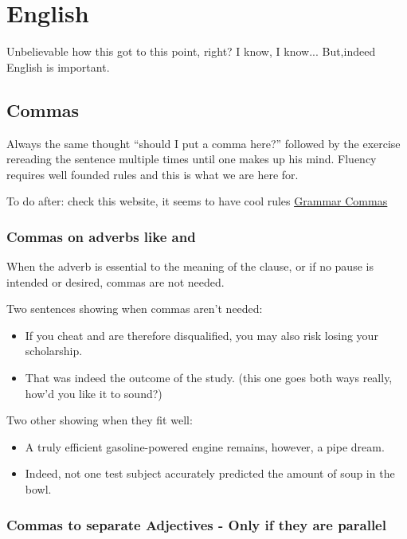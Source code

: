 \section{English}

Unbelievable how this got to this point, right? I know, I know... But,indeed English is important.


\subsection{Commas}

Always the same thought ``should I put a comma here?'' followed by the exercise rereading the sentence multiple times until one makes up his mind. Fluency requires  well founded rules and this is what we are here for.

To do after: check this website, it seems to have cool rules
\href{http://guidetogrammar.org/grammar/commas.htm}{\ul{Grammar Commas}}

\subsubsection{Commas on adverbs like   and }

When the adverb is essential to the meaning of the clause, or if no pause is intended or desired, commas are not needed.


Two sentences showing when commas aren't needed:

\begin{itemize}
    \item If you cheat and are therefore disqualified, you may also risk losing your scholarship.
    \item That was indeed the outcome of the study. (this one goes both ways really, how'd you like it to sound?)
\end{itemize}

Two other showing when they fit well:
\begin{itemize}
    \item A truly efficient gasoline-powered engine remains, however, a pipe dream.
    \item Indeed, not one test subject accurately predicted the amount of soup in the bowl.
\end{itemize}

\subsubsection{Commas to separate Adjectives - Only if they are parallel}

